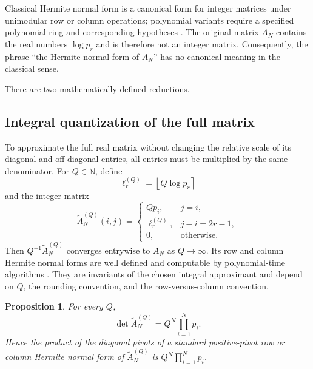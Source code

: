 \documentclass[11pt]{amsart}
\numberwithin{equation}{section}
\theoremstyle{plain}
\newtheorem{proposition}[theorem]{Proposition}
\theoremstyle{definition}
\theoremstyle{remark}
\newcommand{\N}{\mathbb N}
\begin{document}
Classical Hermite normal form is a canonical form for integer matrices under unimodular row or column operations; polynomial variants require a specified polynomial ring and corresponding hypotheses \cite{KannanBachem1979,LabahnNeigerZhou2017}.  The original matrix $A_N$ contains the real numbers $\log p_r$ and is therefore not an integer matrix.  Consequently, the phrase ``the Hermite normal form of $A_N$'' has no canonical meaning in the classical sense.

There are two mathematically defined reductions.

\subsection{Integral quantization of the full matrix}
\label{subsec:integral_quantization}

To approximate the full real matrix without changing the relative scale of its diagonal and off-diagonal entries, all entries must be multiplied by the same denominator.  For $Q\in\N$, define
\begin{equation}
\ell_r^{(Q)}=\left\lfloor Q\log p_r\right\rceil
\label{eq:quantized_logs}
\end{equation}
and the integer matrix
\begin{equation}
\widetilde A_N^{(Q)}(i,j)=
\begin{cases}
Qp_i,&j=i,\\
\ell_r^{(Q)},&j-i=2r-1,\\
0,&\text{otherwise}.
\end{cases}
\label{eq:quantized_A}
\end{equation}
Then $Q^{-1}\widetilde A_N^{(Q)}$ converges entrywise to $A_N$ as $Q\to\infty$.  Its row and column Hermite normal forms are well defined and computable by polynomial-time algorithms \cite{KannanBachem1979}.  They are invariants of the chosen integral approximant and depend on $Q$, the rounding convention, and the row-versus-column convention.

\begin{proposition}
\label{prop:quantized_determinant}
For every $Q$,
\begin{equation}
\det \widetilde A_N^{(Q)}=Q^N\prod_{i=1}^Np_i.
\label{eq:quantized_determinant}
\end{equation}
Hence the product of the diagonal pivots of a standard positive-pivot row or column Hermite normal form of $\widetilde A_N^{(Q)}$ is $Q^N\prod_{i=1}^N p_i$.
\end{proposition}
\end{document}
